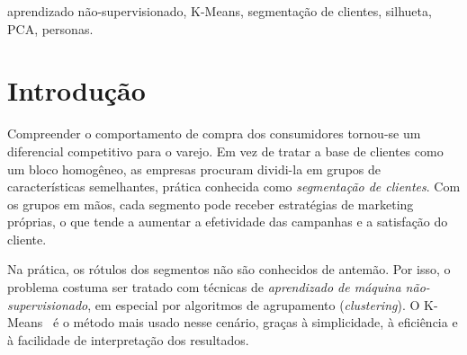 \documentclass[conference]{IEEEtran}
\begin{document}
\begin{abstract}
A segmenta\c{c}\~ao de clientes \'e uma tarefa central no varejo, pois permite direcionar a\c{c}\~oes de marketing a grupos com comportamentos de consumo distintos. Este trabalho apresenta um \textit{sistema} completo de segmenta\c{c}\~ao, e n\~ao apenas a valida\c{c}\~ao de um conjunto de dados, estruturado como um \textit{pipeline} que recebe atributos demogr\'aficos e comportamentais de clientes e produz personas acion\'aveis. O n\'ucleo do sistema \'e o algoritmo K-Means. Destacam-se duas contribui\c{c}\~oes t\'ecnicas. A primeira \'e a escolha do n\'umero de grupos $k$ a partir de tr\^es crit\'erios independentes (m\'etodo do cotovelo, coeficiente de silhueta e \'indice Calinski-Harabasz), de forma que a concord\^ancia entre eles refor\c{c}a a confian\c{c}a na escolha e a diverg\^encia abre espa\c{c}o para discuss\~ao. A segunda \'e a tradu\c{c}\~ao de cada grupo em uma persona com recomenda\c{c}\~ao de marketing. Aplicado ao \textit{Mall Customer Segmentation Dataset}, com 200 clientes, o sistema identificou cinco perfis interpret\'aveis, com coeficiente de silhueta de $0{,}42$, e gerou recomenda\c{c}\~oes de neg\'ocio coerentes com a literatura.
\end{abstract}

\begin{IEEEkeywords}
aprendizado n\~ao-supervisionado, K-Means, segmenta\c{c}\~ao de clientes, silhueta, PCA, personas.
\end{IEEEkeywords}

\section{Introdu\c{c}\~ao}
Compreender o comportamento de compra dos consumidores tornou-se um diferencial competitivo para o varejo. Em vez de tratar a base de clientes como um bloco homog\^eneo, as empresas procuram dividi-la em grupos de caracter\'isticas semelhantes, pr\'atica conhecida como \textit{segmenta\c{c}\~ao de clientes}. Com os grupos em m\~aos, cada segmento pode receber estrat\'egias de marketing pr\'oprias, o que tende a aumentar a efetividade das campanhas e a satisfa\c{c}\~ao do cliente.

Na pr\'atica, os r\'otulos dos segmentos n\~ao s\~ao conhecidos de antem\~ao. Por isso, o problema costuma ser tratado com t\'ecnicas de \textit{aprendizado de m\'aquina n\~ao-supervisionado}, em especial por algoritmos de agrupamento (\textit{clustering}). O K-Means~\cite{macqueen1967} \'e o m\'etodo mais usado nesse cen\'ario, gra\c{c}as \`a simplicidade, \`a efici\^encia e \`a facilidade de interpreta\c{c}\~ao dos resultados.
\end{document}
